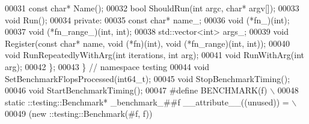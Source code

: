 \begin{DoxyCode}
00031   \textcolor{keyword}{const} \textcolor{keywordtype}{char}* Name();
00032   \textcolor{keywordtype}{bool} ShouldRun(\textcolor{keywordtype}{int} argc, \textcolor{keywordtype}{char}* argv[]);
00033   \textcolor{keywordtype}{void} Run();
00034  \textcolor{keyword}{private}:
00035   \textcolor{keyword}{const} \textcolor{keywordtype}{char}* name\_;
00036   void (*fn\_)(int);
00037   void (*fn\_range\_)(int, int);
00038   std::vector<int> args\_;
00039   \textcolor{keywordtype}{void} Register(\textcolor{keyword}{const} \textcolor{keywordtype}{char}* name, \textcolor{keywordtype}{void} (*fn)(\textcolor{keywordtype}{int}), \textcolor{keywordtype}{void} (*fn\_range)(\textcolor{keywordtype}{int}, \textcolor{keywordtype}{int}));
00040   \textcolor{keywordtype}{void} RunRepeatedlyWithArg(\textcolor{keywordtype}{int} iterations, \textcolor{keywordtype}{int} arg);
00041   \textcolor{keywordtype}{void} RunWithArg(\textcolor{keywordtype}{int} arg);
00042 \};
00043 \}  \textcolor{comment}{// namespace testing}
00044 \textcolor{keywordtype}{void} SetBenchmarkFlopsProcessed(int64\_t);
00045 \textcolor{keywordtype}{void} StopBenchmarkTiming();
00046 \textcolor{keywordtype}{void} StartBenchmarkTiming();
00047 \textcolor{preprocessor}{#define BENCHMARK(f) \(\backslash\)}
00048 \textcolor{preprocessor}{    static ::testing::Benchmark* \_benchmark\_##f \_\_attribute\_\_((unused)) = \(\backslash\)}
00049 \textcolor{preprocessor}{        (new ::testing::Benchmark(#f, f))}
\end{DoxyCode}
